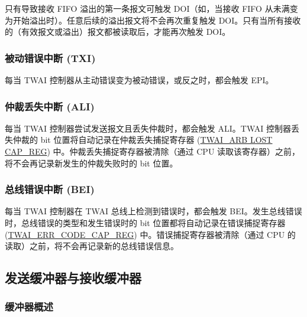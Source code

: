 \documentclass[main\_\_CN.tex]{subfiles}
\begin{document}
只有导致接收 FIFO 溢出的第一条报文可触发 DOI（如，当接收 FIFO 从未满变为开始溢出时）。任意后续的溢出报文将不会再次重复触发 DOI。只有当所有接收的（有效报文或溢出）报文都被读取后，才能再次触发 DOI。

\subsubsection{被动错误中断 (TXI)}
每当 TWAI 控制器从主动错误变为被动错误，或反之时，都会触发 EPI。

\subsubsection{仲裁丢失中断 (ALI)}
每当 TWAI 控制器尝试发送报文且丢失仲裁时，都会触发 ALI。TWAI 控制器丢失仲裁的 bit 位置将自动记录在仲裁丢失捕捉寄存器 (\hyperref[regdesc:TWAIARB LOST CAPREG]{TWAI\_ARB LOST CAP\_REG}) 中。仲裁丢失捕捉寄存器被清除（通过 CPU 读取该寄存器）之前，将不会再记录新发生的仲裁失败时的 bit 位置。

\subsubsection{总线错误中断 (BEI)}
每当 TWAI 控制器在 TWAI 总线上检测到错误时，都会触发 BEI。发生总线错误时，总线错误的类型和发生错误时的 bit 位置都将自动记录在错误捕捉寄存器 (\hyperref[regdesc:TWAIERRCODECAPREG]{TWAI\_ERR\_CODE\_CAP\_REG}) 中。错误捕捉寄存器被清除（通过 CPU 的读取）之前，将不会再记录新的总线错误信息。

\subsection{发送缓冲器与接收缓冲器}
\subsubsection{缓冲器概述}
\end{document}
